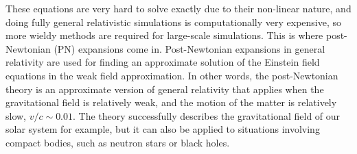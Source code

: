 \documentclass[english, oneside]{HYgradu}
\begin{document}
These equations are very hard to solve exactly due to their non-linear nature, and doing fully general relativistic simulations is computationally very expensive, so more wieldy methods are required for large-scale simulations. This is where post-Newtonian (PN) expansions come in. Post-Newtonian expansions in general relativity are used for finding an approximate solution of the Einstein field equations in the weak field approximation.
In other words, the post-Newtonian theory is an approximate version of general relativity that applies when the gravitational field is relatively weak, and the motion of the matter is relatively slow, $v/c \sim 0.01$. The theory successfully describes the gravitational field of our solar system for example, but it can also be applied to situations involving compact bodies, such as neutron stars or black holes.
%
%
\end{document}
